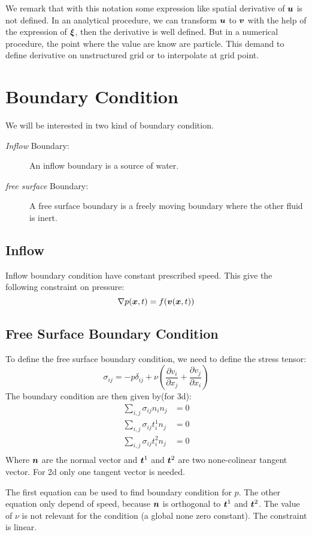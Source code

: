 \begin{remark}
We remark that with this notation some expression like spatial derivative of ${\boldsymbol {u}}$ is not defined.
In an analytical procedure, we can transform ${\boldsymbol {u}}$ to ${\boldsymbol {v}}$ with the help of the expression of ${\boldsymbol {\xi}}$, then the derivative is well defined.
But in a numerical procedure, the point where the value are know are particle. This demand to define derivative on unstructured grid
or to interpolate at grid point.
\end{remark}

\section{Boundary Condition}

We will be interested in two kind of boundary condition.
\begin{description}
 \item[\emph{Inflow} Boundary:]
 An inflow boundary is a source of water.
 \item[\emph{free surface} Boundary:]
 A free surface boundary is a freely moving boundary where the other fluid is inert.
\end{description}

\subsection{Inflow}

Inflow boundary condition have constant prescribed speed.
This give the following constraint on pressure:
\begin{equation}
\nabla p({\boldsymbol {x}},t)=f({\boldsymbol {v}}({\boldsymbol {x}},t))
\end{equation}

\subsection{Free Surface Boundary Condition}
\label{ana:free:surface}
To define the free surface boundary condition, we need to define the stress tensor:
\begin{equation}
	\sigma_{ij}=-p \delta_{ij}+\nu\left(\frac{\partial v_{i}}{\partial x_{j}}+\frac{\partial v_{j}}{\partial x_{i}}\right)
\end{equation}
The boundary condition are then given by(for 3d):
\begin{align}
	\sum_{i,j}\sigma_{ij}n_{i}n_{j}&=0\\
	\sum_{i,j}\sigma_{ij}t^{1}_{i}n_{j}&=0\\
	\sum_{i,j}\sigma_{ij}t^{2}_{i}n_{j}&=0\\
\end{align}
Where ${\boldsymbol {n}}$ are the normal vector and ${\boldsymbol {t}}^1$ and ${\boldsymbol {t}}^2$ are two none-colinear tangent vector.
For 2d only one tangent vector is needed.

The first equation can be used to find boundary condition for $p$.
The other equation only depend of speed, because ${\boldsymbol {n}}$ is orthogonal to ${\boldsymbol {t}}^{1}$ and ${\boldsymbol {t}}^{2}$.
The value of $\nu$ is not relevant for the condition (a global none zero constant).
The constraint is linear.